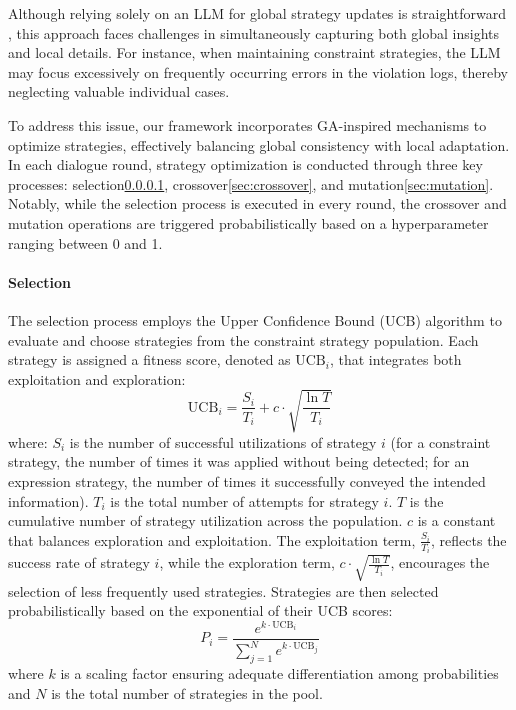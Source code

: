 Although relying solely on an LLM for global strategy updates is straightforward \cite{DBLP:conf/cec/CaiLZLWT24}, this approach faces challenges in simultaneously capturing both global insights and local details. For instance, when maintaining constraint strategies, the LLM may focus excessively on frequently occurring errors in the violation logs, thereby neglecting valuable individual cases.

To address this issue, our framework incorporates GA-inspired mechanisms to optimize strategies, effectively balancing global consistency with local adaptation. In each dialogue round, strategy optimization is conducted through three key processes: selection\ref{sec:selection}, crossover\ref{sec:crossover}, and mutation\ref{sec:mutation}.
Notably, while the selection process is executed in every round, the crossover and mutation operations are triggered probabilistically based on a hyperparameter ranging between 0 and 1.

\paragraph{Selection}
\label{sec:selection}
The selection process employs the Upper Confidence Bound (UCB) algorithm to evaluate and choose strategies from the constraint strategy population. Each strategy is assigned a fitness score, denoted as $\text{UCB}_i$, that integrates both exploitation and exploration:
\begin{equation}
\text{UCB}_i = \frac{S_i}{T_i} + c \cdot \sqrt{\frac{\ln T}{T_i}}
\end{equation}
where:
  \(S_i\) is the number of successful utilizations of strategy \(i\) (for a constraint strategy, the number of times it was applied without being detected; for an expression strategy, the number of times it successfully conveyed the intended information).
  \(T_i\) is the total number of attempts for strategy \(i\).
  \(T\) is the cumulative number of strategy utilization across the population.
  \(c\) is a constant that balances exploration and exploitation.
The exploitation term, \(\frac{S_i}{T_i}\), reflects the success rate of strategy \(i\), while the exploration term, \(c \cdot \sqrt{\frac{\ln T}{T_i}}\), encourages the selection of less frequently used strategies. Strategies are then selected probabilistically based on the exponential of their UCB scores:
\begin{equation}
P_i = \frac{e^{k \cdot \text{UCB}_i}}{\sum_{j=1}^{N} e^{k \cdot \text{UCB}_j}}
\end{equation}
where \(k\) is a scaling factor ensuring adequate differentiation among probabilities and \(N\) is the total number of strategies in the pool.

